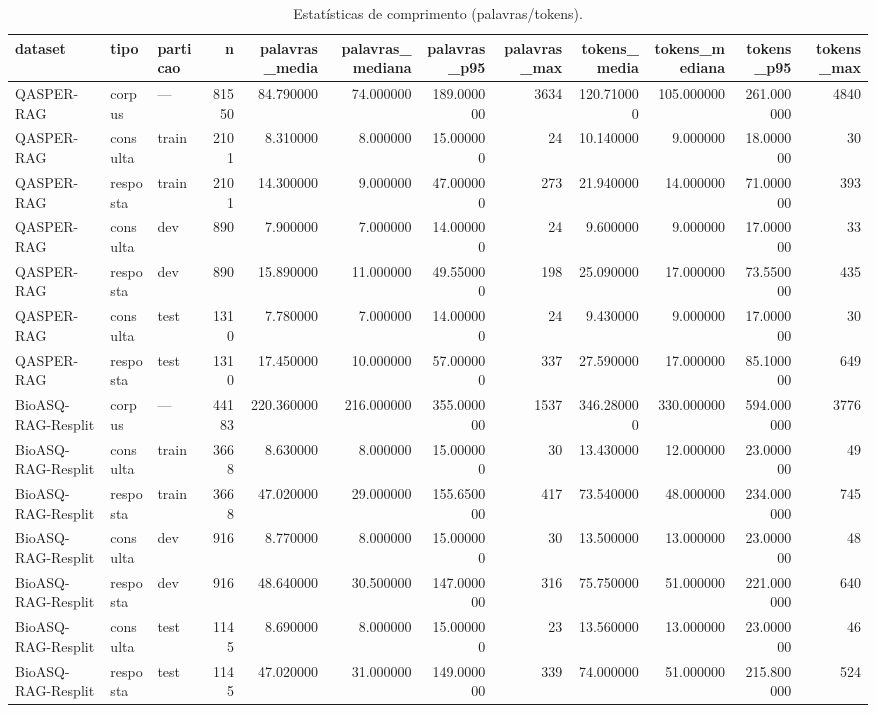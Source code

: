 \begin{table}
\caption{Estatísticas de comprimento (palavras/tokens).}
\label{tab:tabela_comprimentos}
\begin{tabular}{lllrrrrrrrrr}
\toprule
dataset & tipo & particao & n & palavras\_media & palavras\_mediana & palavras\_p95 & palavras\_max & tokens\_media & tokens\_mediana & tokens\_p95 & tokens\_max \\
\midrule
QASPER-RAG & corpus & — & 81550 & 84.790000 & 74.000000 & 189.000000 & 3634 & 120.710000 & 105.000000 & 261.000000 & 4840 \\
QASPER-RAG & consulta & train & 2101 & 8.310000 & 8.000000 & 15.000000 & 24 & 10.140000 & 9.000000 & 18.000000 & 30 \\
QASPER-RAG & resposta & train & 2101 & 14.300000 & 9.000000 & 47.000000 & 273 & 21.940000 & 14.000000 & 71.000000 & 393 \\
QASPER-RAG & consulta & dev & 890 & 7.900000 & 7.000000 & 14.000000 & 24 & 9.600000 & 9.000000 & 17.000000 & 33 \\
QASPER-RAG & resposta & dev & 890 & 15.890000 & 11.000000 & 49.550000 & 198 & 25.090000 & 17.000000 & 73.550000 & 435 \\
QASPER-RAG & consulta & test & 1310 & 7.780000 & 7.000000 & 14.000000 & 24 & 9.430000 & 9.000000 & 17.000000 & 30 \\
QASPER-RAG & resposta & test & 1310 & 17.450000 & 10.000000 & 57.000000 & 337 & 27.590000 & 17.000000 & 85.100000 & 649 \\
BioASQ-RAG-Resplit & corpus & — & 44183 & 220.360000 & 216.000000 & 355.000000 & 1537 & 346.280000 & 330.000000 & 594.000000 & 3776 \\
BioASQ-RAG-Resplit & consulta & train & 3668 & 8.630000 & 8.000000 & 15.000000 & 30 & 13.430000 & 12.000000 & 23.000000 & 49 \\
BioASQ-RAG-Resplit & resposta & train & 3668 & 47.020000 & 29.000000 & 155.650000 & 417 & 73.540000 & 48.000000 & 234.000000 & 745 \\
BioASQ-RAG-Resplit & consulta & dev & 916 & 8.770000 & 8.000000 & 15.000000 & 30 & 13.500000 & 13.000000 & 23.000000 & 48 \\
BioASQ-RAG-Resplit & resposta & dev & 916 & 48.640000 & 30.500000 & 147.000000 & 316 & 75.750000 & 51.000000 & 221.000000 & 640 \\
BioASQ-RAG-Resplit & consulta & test & 1145 & 8.690000 & 8.000000 & 15.000000 & 23 & 13.560000 & 13.000000 & 23.000000 & 46 \\
BioASQ-RAG-Resplit & resposta & test & 1145 & 47.020000 & 31.000000 & 149.000000 & 339 & 74.000000 & 51.000000 & 215.800000 & 524 \\

\end{tabular}
\end{table}
